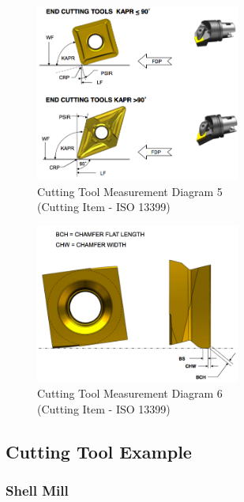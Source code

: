 \documentclass{mtconnect}	%
\begin{document}
\begin{figure}[ht]
  \centering
  \includegraphics[width=0.6\textwidth]{figures/a5-cutting-item-measurement-diagram-5.png}
  \caption{Cutting Tool Measurement Diagram 5
  \\  (Cutting Item - ISO 13399)}
  \label{fig:a5-cutting-item-measurement-diagram-5}
\end{figure}
\FloatBarrier

\begin{figure}[ht]
  \centering
  \includegraphics[width=0.6\textwidth]{figures/a6-cutting-item-measurement-diagram-6.png}
  \caption{Cutting Tool Measurement Diagram 6
  \\  (Cutting Item - ISO 13399)}
  \label{fig:a6-cutting-item-measurement-diagram-6}
\end{figure}
\FloatBarrier

\pagebreak

\subsection{Cutting Tool Example}

\subsubsection{Shell Mill}
\end{document}
